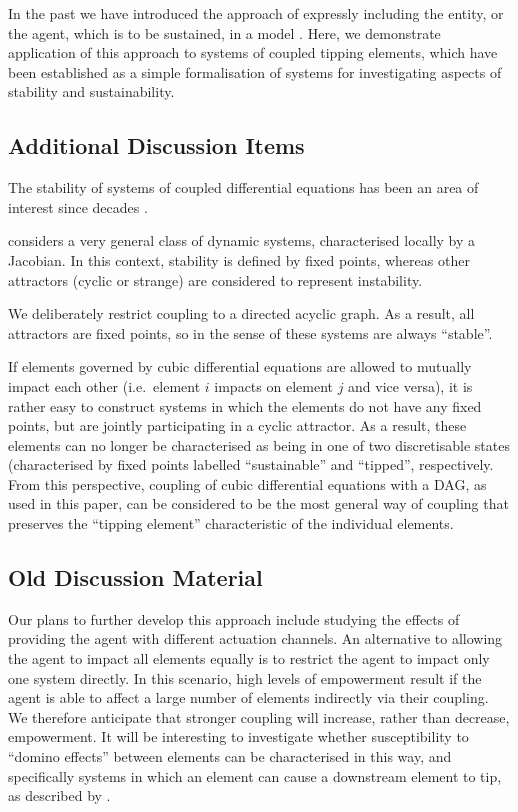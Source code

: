 \documentclass[conference]{IEEEtran}
\begin{document}
In the past we have introduced the approach of expressly including the
entity, or the agent, which is to be sustained, in a model
\cite{Kim2009_sustainability}. Here, we demonstrate application of
this approach to systems of coupled tipping elements, which have been
established as a simple formalisation of systems for investigating
aspects of stability and sustainability.


\subsection{Additional Discussion Items}

The stability of systems of coupled differential equations has been an
area of interest since decades
\cite{May1972_stablelargecomplexsystem,Landi2018_ecologicalnetworks}.

\cite{May1972_stablelargecomplexsystem} considers a very general
class of dynamic systems, characterised locally by a Jacobian. In this
context, stability is defined by fixed points, whereas other
attractors (cyclic or strange) are considered to represent
instability.

We deliberately restrict coupling to a directed acyclic graph. As a
result, all attractors are fixed points, so in the sense of
\cite{May1972_stablelargecomplexsystem} these systems are always
``stable''.

If elements governed by cubic differential equations are allowed to
mutually impact each other (i.e.\ element $i$ impacts on element $j$
and vice versa), it is rather easy to construct systems in which the
elements do not have any fixed points, but are jointly participating
in a cyclic attractor. As a result, these elements can no longer be
characterised as being in one of two discretisable states
(characterised by fixed points labelled ``sustainable'' and
``tipped'', respectively. From this perspective, coupling of cubic
differential equations with a DAG, as used in this paper, can be
considered to be the most general way of coupling that preserves the
``tipping element'' characteristic of the individual elements.

\subsection{Old Discussion Material}



Our plans to further develop this approach include studying the
effects of providing the agent with different actuation channels. An
alternative to allowing the agent to impact all elements equally is to
restrict the agent to impact only one system directly. In this
scenario, high levels of empowerment result if the agent is able to
affect a large number of elements indirectly via their coupling. We
therefore anticipate that stronger coupling will increase, rather than
decrease, empowerment. It will be interesting to investigate whether
susceptibility to ``domino effects'' between elements can be
characterised in this way, and specifically systems in which an
element can cause a downstream element to tip, as described by
\cite{Brummitt2015_coupledcatastrophes}.
\end{document}
